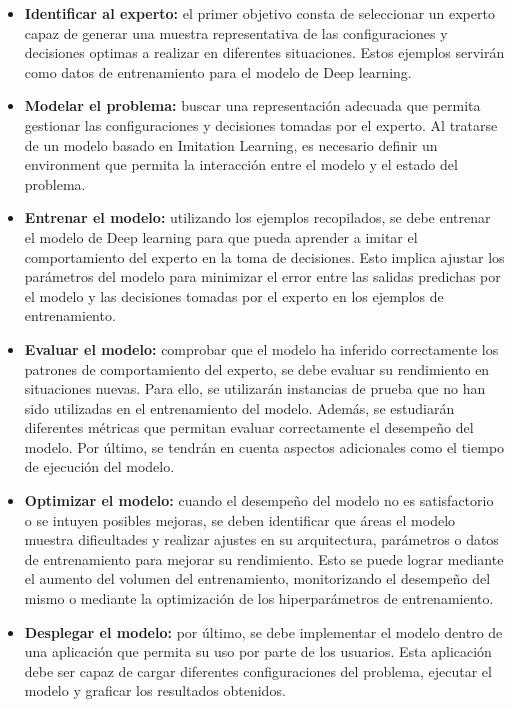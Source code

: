 \begin{itemize}
\item \textbf{Identificar al experto:} el primer objetivo consta de seleccionar un
experto capaz de generar una muestra representativa de las configuraciones y decisiones 
optimas a realizar en diferentes situaciones. Estos ejemplos servirán como datos 
de entrenamiento para el modelo de Deep learning.
\item \textbf{Modelar el problema:} buscar una representación adecuada que permita gestionar 
las configuraciones y decisiones tomadas por el experto. Al tratarse de un modelo basado en 
Imitation Learning, es necesario definir un environment que permita la interacción entre el 
modelo y el estado del problema.
\item \textbf{Entrenar el modelo:} utilizando los ejemplos recopilados, se debe entrenar 
el modelo de Deep learning para que pueda aprender a imitar el comportamiento 
del experto en la toma de decisiones. Esto implica ajustar los parámetros del modelo para 
minimizar el error entre las salidas predichas por el modelo y las decisiones tomadas por 
el experto en los ejemplos de entrenamiento.
\item \textbf{Evaluar el modelo:} comprobar que el modelo ha inferido correctamente
los patrones de comportamiento del experto, se debe evaluar su rendimiento en situaciones
nuevas. Para ello, se utilizarán instancias de prueba que no han sido utilizadas en el
entrenamiento del modelo. Además, se estudiarán diferentes métricas que permitan evaluar 
correctamente el desempeño del modelo. Por último, se tendrán en cuenta aspectos adicionales 
como el tiempo de ejecución del modelo.
\item \textbf{Optimizar el modelo:} cuando el desempeño del modelo no es satisfactorio o 
se intuyen posibles mejoras, se deben identificar que áreas el modelo muestra dificultades y realizar ajustes 
en su arquitectura, parámetros o datos de entrenamiento para mejorar su rendimiento. Esto 
se puede lograr mediante el aumento del volumen del entrenamiento, monitorizando el desempeño
del mismo o mediante la optimización de los hiperparámetros de entrenamiento.
\item \textbf{Desplegar el modelo:} por último, se debe implementar el modelo dentro de
una aplicación que permita su uso por parte de los usuarios. Esta aplicación debe ser capaz
de cargar diferentes configuraciones del problema, ejecutar el modelo y graficar los resultados
obtenidos.
\end{itemize}

